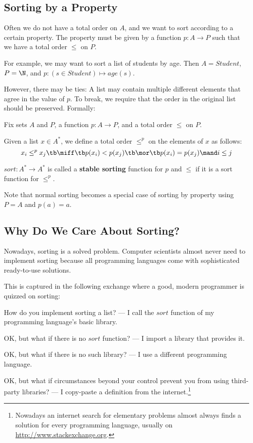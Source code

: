 \subsection{Sorting by a Property}\label{sec:ad:sort:stable}

Often we do not have a total order on $A$, and we want to sort according to a certain property.
The property must be given by a function $p:A\to P$ such that we have a total order $\leq$ on $P$.

For example, we may want to sort a list of students by age.
Then $A=Student$, $P=\N$, and $p:(s\in Student)\mapsto age(s)$.

However, there may be ties: A list may contain multiple different elements that agree in the value of $p$.
To break, we require that the order in the original list should be preserved.
Formally:

\begin{definition}\label{def:ad:sort:stable}
Fix sets $A$ and $P$, a function $p:A\to P$, and a total order $\leq$ on $P$.

Given a list $x\in A^*$, we define a total order $\leq^p$ on the elements of $x$ as follows:
 \[x_i \leq^p x_j \tb\miff\tb p(x_i) < p(x_j) \tb \mor \tb p(x_i)=p(x_j) \mand i\leq j\]

$sort:A^*\to A^*$ is called a \textbf{stable sorting} function for $p$ and $\leq$ if it is a sort function for $\leq^p$.
\end{definition}

Note that normal sorting becomes a special case of sorting by property using $P=A$ and $p(a)=a$.

\subsection{Why Do We Care About Sorting?}

Nowadays, sorting is a solved problem.
Computer scientists almost never need to implement sorting because all programming languages come with sophisticated ready-to-use solutions.

This is captured in the following exchange where a good, modern programmer is quizzed on sorting:
\begin{compactenum}
\item How do you implement sorting a list? --- I call the $\mathit{sort}$ function of my programming language's basic library.
\item OK, but what if there is no $\mathit{sort}$ function? --- I import a library that provides it.
\item OK, but what if there is no such library? --- I use a different programming language.
\item OK, but what if circumstances beyond your control prevent you from using third-party libraries? --- I copy-paste a definition from the internet.\footnote{Nowadays an internet search for elementary problems almost always finds a solution for every programming language, usually on \url{http://www.stackexchange.org}.}
\end{compactenum}

